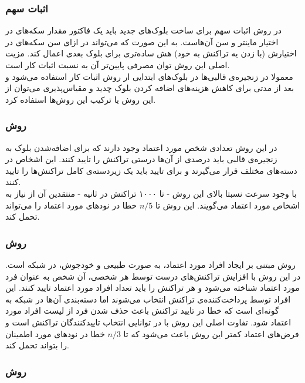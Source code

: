 \subsubsection{اثبات سهم}
در روش اثبات سهم
\cite{PoS}
برای ساخت بلوک‌های جدید باید یک فاکتور مقدار سکه‌های در اختیار ماینتر و سن آن‌هاست. به این صورت که می‌تواند در ازای سن‌ سکه‌های در اختیارش (با زدن یه تراکنش به خود) هش ساده‌تری برای بلوک بعدی اعمال کند. مزیت اصلی این روش توان مصرفی پایین‌تر آن به نسبت اثبات کار است. 
\\
معمولا در زنجیره‌ی قالبی‌ها در بلوک‌های ابتدایی ار روش اثبات کار استفاده می‌شود و بعد از مدتی برای کاهش هزینه‌های اضافه کردن بلوک چدید و مقیاس‌پذیری می‌توان از این روش یا ترکیب این روش‌ها استفاده کرد.

\subsubsection{روش }
در این روش
\cite{ripple} \cite{ripple2}
 تعدادی شخص مورد اعتماد وجود دارند که برای اضافه‌شدن بلوک به زنجیره‌ی قالبی باید درصدی از آن‌ها درستی تراکنش را تایید کنند. این اشخاص در دسته‌های مختلف قرار می‌گیرند و برای تایید باید یک زیردسته‌ی کامل تراکنش‌ها را تایید کنند.
 \\
 با وجود سرعت نسبتا بالای این روش - تا ۱۰۰۰ تراکنش در ثانیه - منتقدین آن از نیاز به اشخاص مورد اعتماد می‌گویند. این روش تا $ n /5 $ خطا در نود‌های مورد اعتماد را می‌تواند تحمل کند.


\subsubsection{روش }
 روش 
\cite{scp}
 مبتنی بر ایجاد افراد مورد اعتماد، به صورت طبیعی و خودجوش، در شبکه است. در این روش با افزایش تراکنش‌های درست توسط هر شخصی، آن شخص به عنوان فرد مورد اعتماد شناخته می‌شود و هر تراکنش را باید تعداد افراد مورد اعتماد تایید کنند. این افراد توسط پرداخت‌کننده‌ی تراکنش انتخاب می‌شوند اما دسته‌بندی آن‌ها در شبکه‌ به گونه‌ای است که خطا در تایید تراکنش باعث حذف شدن فرد از لیست افراد مورد اعتماد شود. تفاوت اصلی این روش با 
 در توانایی انتخاب تاییدکنندگان تراکنش است و فرض‌های اعتماد کمتر این روش باعث می‌شود که تا $ n /3 $ خطا در نود‌های مورد اطمینان را بتواند تحمل کند.
 
 \subsubsection{روش }
 
